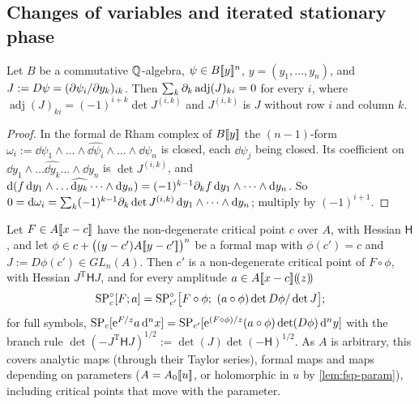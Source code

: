 
\subsection{Changes of variables and iterated stationary phase}
\label{sec:fsp-change}

\begin{lem}
\label{lem:fsp-piola}
Let $B$ be a commutative $\mathbb{Q}$-algebra, $\psi\in B[\![ y ]\!]^n$, $y=(y_1,\dots,y_n)$, and $J:=D\psi=(\partial\psi_i/\partial y_k)_{ik}$. Then $\sum_k\partial_k\operatorname{adj}(J)_{ki}=0$ for every $i$, where $\operatorname{adj}(J)_{ki}=(-1)^{i+k}\det J^{(i,k)}$ and $J^{(i,k)}$ is $J$ without row $i$ and column $k$.
\end{lem}

\begin{proof}
In the formal de Rham complex of $B[\![ y ]\!]$ the $(n-1)$-form $\omega_i:=\dd\psi_1\wedge\dots\wedge\widehat{\dd\psi_i}\wedge\dots\wedge\dd\psi_n$ is closed, each $\dd\psi_j$ being closed. Its coefficient on $\dd y_1\wedge\dots\widehat{\dd y_k}\dots\wedge\dd y_n$ is $\det J^{(i,k)}$, and $\mathrm{d}(f\,\mathrm{d} y_1\wedge\dots\widehat{\mathrm{d} y_k}\dots\wedge\mathrm{d} y_n)=(-1)^{k-1}\partial_kf\,\mathrm{d} y_1\wedge\dots\wedge\mathrm{d} y_n$. So $0=\mathrm{d}\omega_i=\sum_k(-1)^{k-1}\partial_k\det J^{(i,k)}\,\mathrm{d} y_1\wedge\dots\wedge\mathrm{d} y_n$; multiply by $(-1)^{i+1}$.
\end{proof}

\begin{lem}
\label{lem:fsp-cov}
Let $F\in A[\![ x-c ]\!]$ have the non-degenerate critical point $c$ over $A$, with Hessian $\mathsf H$, and let $\phi\in c+\bigl((y-c')A[\![ y-c' ]\!]\bigr)^n$ be a formal map with $\phi(c')=c$ and $J:=D\phi(c')\in GL_n(A)$. Then $c'$ is a non-degenerate critical point of $F\circ\phi$, with Hessian $J^{\mathrm T}\mathsf HJ$, and for every amplitude $a\in A[\![ x-c ]\!](\!(z)\!)$
\[
\SPn_c[F;a]=\SPn_{c'}\bigl[F\circ\phi;\ (a\circ\phi)\det D\phi/\det J\bigr];
\]
for full symbols, $\mathrm{SP}_c[\mathrm{e}^{F/z}a\,\mathrm{d}^nx]=\mathrm{SP}_{c'}[\mathrm{e}^{(F\circ\phi)/z}(a\circ\phi)\det(D\phi)\,\mathrm{d}^ny]$ with the branch rule $\det(-J^{\mathrm T}\mathsf HJ)^{1/2}:=\det(J)\det(-\mathsf H)^{1/2}$. As $A$ is arbitrary, this covers analytic maps (through their Taylor series), formal maps and maps depending on parameters ($A=A_0[\![ u ]\!]$, or holomorphic in $u$ by \cref{lem:fsp-param}), including critical points that move with the parameter.
\end{lem}

